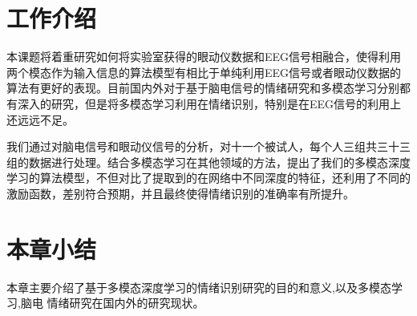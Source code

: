 	 
\section{工作介绍}
	本课题将着重研究如何将实验室获得的眼动仪数据和EEG信号相融合，使得利用两个模态作为输入信息的算法模型有相比于单纯利用EEG信号或者眼动仪数据的算法有更好的表现。目前国内外对于基于脑电信号的情绪研究和多模态学习分别都有深入的研究，但是将多模态学习利用在情绪识别，特别是在EEG信号的利用上还远远不足。
		
	我们通过对脑电信号和眼动仪信号的分析，对十一个被试人，每个人三组共三十三组的数据进行处理。结合多模态学习在其他领域的方法，提出了我们的多模态深度学习的算法模型，不但对比了提取到的在网络中不同深度的特征，还利用了不同的激励函数，差别符合预期，并且最终使得情绪识别的准确率有所提升。
\section{本章小结}
	本章主要介绍了基于多模态深度学习的情绪识别研究的目的和意义,以及多模态学习,脑电 情绪研究在国内外的研究现状。